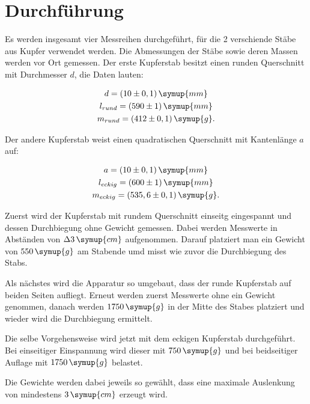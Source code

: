\section{Durchführung}
\label{sec:Durchführung}

Es werden insgesamt vier Messreihen durchgeführt, für die 2 verschiende Stäbe aus Kupfer verwendet werden.
Die Abmessungen der Stäbe sowie deren Massen werden vor Ort gemessen.
Der erste Kupferstab besitzt einen runden Querschnitt mit Durchmesser $d$, die Daten lauten:

\begin{gather}
    d=(10\pm0,1)\,\symup{mm} \notag \\
    l_{rund}=(590\pm1)\,\symup{mm} \notag \\
    m_{rund}=(412\pm0,1)\,\symup{g} \notag.
\end{gather}

Der andere Kupferstab weist einen quadratischen Querschnitt mit Kantenlänge $a$ auf:

\begin{gather}
    a=(10\pm0,1)\,\symup{mm} \notag \\
    l_{eckig}=(600\pm1)\,\symup{mm} \notag \\
    m_{eckig}=(535,6\pm0,1)\,\symup{g} \notag.
\end{gather}

Zuerst wird der Kupferstab mit rundem Querschnitt einseitg eingespannt und dessen Durchbiegung ohne Gewicht gemessen.
Dabei werden Messwerte in Abständen von $\Delta 3\,\symup{cm}$ aufgenommen.
Darauf platziert man ein Gewicht von $550\,\symup{g}$ am Stabende umd misst wie zuvor die Durchbiegung des Stabs.

Als nächstes wird die Apparatur so umgebaut, dass der runde Kupferstab auf beiden Seiten aufliegt.
Erneut werden zuerst Messwerte ohne ein Gewicht genommen, danach werden $1750\,\symup{g}$
in der Mitte des Stabes platziert und wieder wird die Durchbiegung ermittelt.

Die selbe Vorgehensweise wird jetzt mit dem eckigen Kupferstab durchgeführt.
Bei einseitiger Einspannung wird dieser mit $750\,\symup{g}$ und bei beidseitiger Auflage mit $1750\,\symup{g}$ belastet.

Die Gewichte werden dabei jeweils so gewählt, dass eine maximale Auslenkung von mindestens $3\,\symup{cm}$ erzeugt wird.